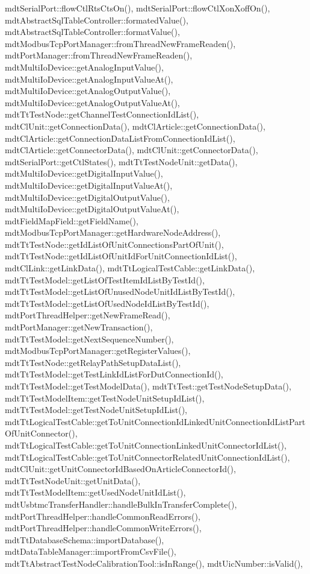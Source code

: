 mdt\-Serial\-Port\-::flow\-Ctl\-Rts\-Cts\-On(), mdt\-Serial\-Port\-::flow\-Ctl\-Xon\-Xoff\-On(), mdt\-Abstract\-Sql\-Table\-Controller\-::formated\-Value(), mdt\-Abstract\-Sql\-Table\-Controller\-::format\-Value(), mdt\-Modbus\-Tcp\-Port\-Manager\-::from\-Thread\-New\-Frame\-Readen(), mdt\-Port\-Manager\-::from\-Thread\-New\-Frame\-Readen(), mdt\-Multi\-Io\-Device\-::get\-Analog\-Input\-Value(), mdt\-Multi\-Io\-Device\-::get\-Analog\-Input\-Value\-At(), mdt\-Multi\-Io\-Device\-::get\-Analog\-Output\-Value(), mdt\-Multi\-Io\-Device\-::get\-Analog\-Output\-Value\-At(), mdt\-Tt\-Test\-Node\-::get\-Channel\-Test\-Connection\-Id\-List(), mdt\-Cl\-Unit\-::get\-Connection\-Data(), mdt\-Cl\-Article\-::get\-Connection\-Data(), mdt\-Cl\-Article\-::get\-Connection\-Data\-List\-From\-Connection\-Id\-List(), mdt\-Cl\-Article\-::get\-Connector\-Data(), mdt\-Cl\-Unit\-::get\-Connector\-Data(), mdt\-Serial\-Port\-::get\-Ctl\-States(), mdt\-Tt\-Test\-Node\-Unit\-::get\-Data(), mdt\-Multi\-Io\-Device\-::get\-Digital\-Input\-Value(), mdt\-Multi\-Io\-Device\-::get\-Digital\-Input\-Value\-At(), mdt\-Multi\-Io\-Device\-::get\-Digital\-Output\-Value(), mdt\-Multi\-Io\-Device\-::get\-Digital\-Output\-Value\-At(), mdt\-Field\-Map\-Field\-::get\-Field\-Name(), mdt\-Modbus\-Tcp\-Port\-Manager\-::get\-Hardware\-Node\-Address(), mdt\-Tt\-Test\-Node\-::get\-Id\-List\-Of\-Unit\-Connections\-Part\-Of\-Unit(), mdt\-Tt\-Test\-Node\-::get\-Id\-List\-Of\-Unit\-Id\-For\-Unit\-Connection\-Id\-List(), mdt\-Cl\-Link\-::get\-Link\-Data(), mdt\-Tt\-Logical\-Test\-Cable\-::get\-Link\-Data(), mdt\-Tt\-Test\-Model\-::get\-List\-Of\-Test\-Item\-Id\-List\-By\-Test\-Id(), mdt\-Tt\-Test\-Model\-::get\-List\-Of\-Unused\-Node\-Unit\-Id\-List\-By\-Test\-Id(), mdt\-Tt\-Test\-Model\-::get\-List\-Of\-Used\-Node\-Id\-List\-By\-Test\-Id(), mdt\-Port\-Thread\-Helper\-::get\-New\-Frame\-Read(), mdt\-Port\-Manager\-::get\-New\-Transaction(), mdt\-Tt\-Test\-Model\-::get\-Next\-Sequence\-Number(), mdt\-Modbus\-Tcp\-Port\-Manager\-::get\-Register\-Values(), mdt\-Tt\-Test\-Node\-::get\-Relay\-Path\-Setup\-Data\-List(), mdt\-Tt\-Test\-Model\-::get\-Test\-Link\-Id\-List\-For\-Dut\-Connection\-Id(), mdt\-Tt\-Test\-Model\-::get\-Test\-Model\-Data(), mdt\-Tt\-Test\-::get\-Test\-Node\-Setup\-Data(), mdt\-Tt\-Test\-Model\-Item\-::get\-Test\-Node\-Unit\-Setup\-Id\-List(), mdt\-Tt\-Test\-Model\-::get\-Test\-Node\-Unit\-Setup\-Id\-List(), mdt\-Tt\-Logical\-Test\-Cable\-::get\-To\-Unit\-Connection\-Id\-Linked\-Unit\-Connection\-Id\-List\-Part\-Of\-Unit\-Connector(), mdt\-Tt\-Logical\-Test\-Cable\-::get\-To\-Unit\-Connection\-Linked\-Unit\-Connector\-Id\-List(), mdt\-Tt\-Logical\-Test\-Cable\-::get\-To\-Unit\-Connector\-Related\-Unit\-Connection\-Id\-List(), mdt\-Cl\-Unit\-::get\-Unit\-Connector\-Id\-Based\-On\-Article\-Connector\-Id(), mdt\-Tt\-Test\-Node\-Unit\-::get\-Unit\-Data(), mdt\-Tt\-Test\-Model\-Item\-::get\-Used\-Node\-Unit\-Id\-List(), mdt\-Usbtmc\-Transfer\-Handler\-::handle\-Bulk\-In\-Transfer\-Complete(), mdt\-Port\-Thread\-Helper\-::handle\-Common\-Read\-Errors(), mdt\-Port\-Thread\-Helper\-::handle\-Common\-Write\-Errors(), mdt\-Tt\-Database\-Schema\-::import\-Database(), mdt\-Data\-Table\-Manager\-::import\-From\-Csv\-File(), mdt\-Tt\-Abstract\-Test\-Node\-Calibration\-Tool\-::is\-In\-Range(), mdt\-Uic\-Number\-::is\-Valid(), 